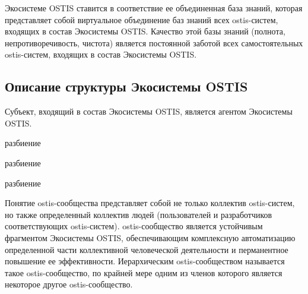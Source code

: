 Экосистеме OSTIS ставится в соответствие ее объединенная база знаний, которая представляет собой виртуальное объединение баз знаний всех ostis-систем, входящих в состав Экосистемы OSTIS.
Качество этой базы знаний (полнота, непротиворечивость, чистота) является постоянной заботой всех самостоятельных ostis-систем, входящих в состав Экосистемы OSTIS.


\subsection{Описание структуры Экосистемы OSTIS}
{\label{sec_ecosystem_structure_description}} 

Субъект, входящий в состав Экосистемы OSTIS, является агентом Экосистемы OSTIS.

\begin{SCn}
\begin{scnrelfromset}{разбиение}
	\begin{scnindent}
    \begin{scnrelfromset}{разбиение}
    \end{scnrelfromset}
	\end{scnindent}
	\begin{scnindent}
    \begin{scnrelfromset}{разбиение}
    \end{scnrelfromset}
	\end{scnindent}
\end{scnrelfromset}
\end{SCn}

Понятие ostis-сообщества представляет собой не только коллектив ostis-систем, но также определенный коллектив людей (пользователей и разработчиков соответствующих ostis-систем). 
ostis-сообщество является устойчивым фрагментом Экосистемы OSTIS, обеспечивающим комплексную автоматизацию определенной части коллективной человеческой деятельности и перманентное повышение ее эффективности. 
Иерархическим ostis-сообществом называется такое ostis-сообщество, по крайней мере одним из членов которого является некоторое другое ostis-сообщество.

